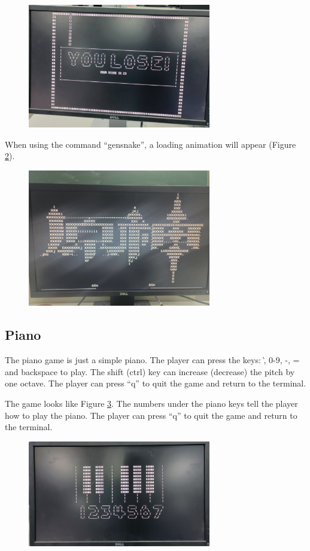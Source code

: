 \documentclass[
	a4paper, %
	11pt, %
]{CSUniSchoolLabReport}
\begin{document}
\begin{figure}[!htb]
    \centering
    \includegraphics[width=8cm]{image5.png}
    \label{fig:image5}
\end{figure}

When using the command ``gensnake'', a loading animation will appear (Figure \ref{fig:image11}).
\begin{figure}[!htb]
    \centering
    \includegraphics[width=8cm]{image11.png}
    \label{fig:image11}
\end{figure}


\subsection{Piano}
The piano game is just a simple piano. The player can press the keys: \`, 0-9, -, = and backspace to play. The shift (ctrl) key can increase (decrease) the pitch by one octave. The player can press ``q'' to quit the game and return to the terminal.

The game looks like Figure \ref{fig:image6}. The numbers under the piano keys tell the player how to play the piano. The player can press ``q'' to quit the game and return to the terminal.

\begin{figure}[!htb]
    \centering
    \includegraphics[width=8cm]{image6.png}
    \label{fig:image6}
\end{figure}
\end{document}
